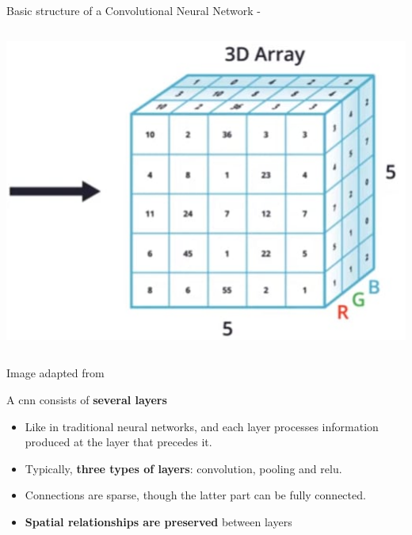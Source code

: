 \begin{frame}[t,allowframebreaks]{Basic structure of a Convolutional Neural Network -}
\begin{columns}
\begin{column}{0.32\textwidth}
            \begin{center}
                \includegraphics[width=1.0\textwidth]
                  {./images/cnn/example_inputs/example_1_cat_array.png}\\
            \end{center}      
        \end{column}
    \end{columns}
    \begin{center}
        {\scriptsize 
        \color{col:attribution} 
        Image adapted from \cite{DevCommunity:GoingFurtherWithCNN}}\\
    \end{center}      

    \framebreak

    A \gls{cnn} consists of {\bf several layers}

    \begin{itemize}
        \item
            Like in traditional  neural networks, 
            and each layer processes information produced at the layer that precedes it.
        \item
            Typically, {\bf three types of layers}:
            \gls{convolution}, 
            \gls{pooling} and 
            \gls{relu}.
        \item
            Connections are sparse, though the latter part can be fully connected.
        \item
            {\bf Spatial relationships are preserved} between layers
    \end{itemize}


\end{frame}

